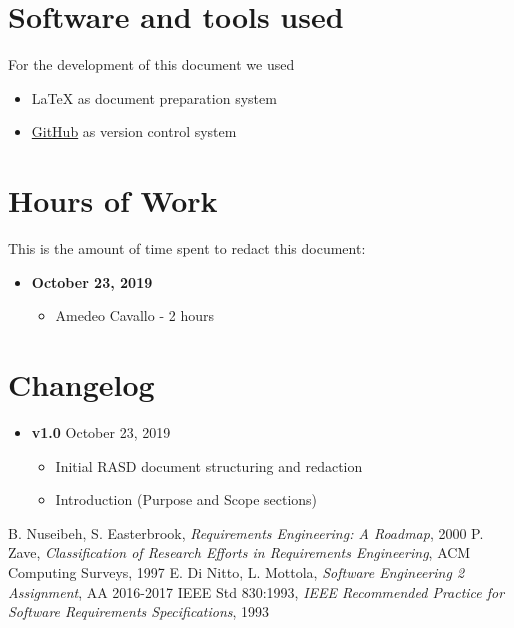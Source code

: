 \begin{appendices}
	\section{Software and tools used}
	For the development of this document we used
	\begin{itemize}
		\item \LaTeX{} as document preparation system
		\item \href{http://github.com}{GitHub} as version control system
	\end{itemize}
		
	\section{Hours of Work}
	This is the amount of time spent to redact this document:
	\begin{itemize}
		\item \textbf{October 23, 2019}
		\begin{itemize}
			\item Amedeo Cavallo - 2 hours
		\end{itemize}
	\end{itemize}
	
	\section{Changelog}
	\begin{itemize}
		\item \textbf{v1.0} October 23, 2019
		\begin{itemize}
			\item Initial RASD document structuring and redaction
			\item Introduction (Purpose and Scope sections)
		\end{itemize}
	\end{itemize}
\end{appendices}
\clearpage
\begin{thebibliography}{9}
B. Nuseibeh, S. Easterbrook, \emph{Requirements Engineering: A Roadmap}, 2000
P. Zave, \emph{Classification of Research Efforts in Requirements
Engineering}, ACM Computing Surveys, 1997
 E. Di Nitto, L. Mottola, \emph{Software Engineering 2 Assignment}, AA 2016-2017
IEEE Std 830:1993, \emph{IEEE Recommended Practice for Software Requirements Specifications}, 1993
\end{thebibliography}